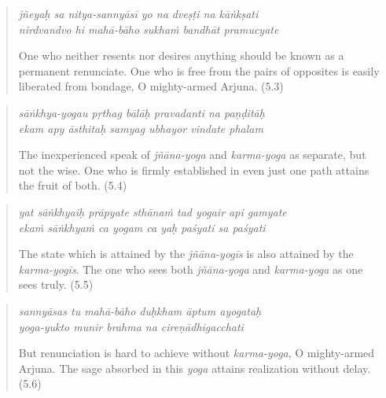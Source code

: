 \documentclass[12pt, twoside, openright]{memoir}
\begin{document}
\par
\begin{verse}
\textit{jñeyaḥ sa nitya-sannyāsī yo na dveṣṭi na kāṅkṣati} \\
\textit{nirdvandvo hi mahā-bāho sukhaṁ bandhāt pramucyate}

\noindent One who neither resents nor desires anything should be known as a permanent renunciate. One who is free from the pairs of opposites is easily liberated from bondage, O mighty-armed Arjuna. (5.3)
\end{verse}
\par



\par
\begin{verse}
\textit{sāṅkhya-yogau pṛthag bālāḥ pravadanti na paṇḍitāḥ} \\
\textit{ekam apy āsthitaḥ samyag ubhayor vindate phalam}

\noindent The inexperienced speak of \textit{jñāna-yoga} and \textit{karma-yoga} as separate, but not the wise. One who is firmly established in even just one path attains the fruit of both. (5.4)
\end{verse}
\par



\par
\begin{verse}
\textit{yat sāṅkhyaiḥ prāpyate sthānaṁ tad yogair api gamyate} \\
\textit{ekaṁ sāṅkhyaṁ ca yogam ca yaḥ paśyati sa paśyati}

\noindent The state which is attained by the \textit{jñāna-yogīs} is also attained by the \textit{karma-yogīs}. The one who sees both \textit{jñāna-yoga} and \textit{karma-yoga} as one sees truly. (5.5)
\end{verse}
\par



\par
\begin{verse}
\textit{sannyāsas tu mahā-bāho duḥkham āptum ayogataḥ} \\
\textit{yoga-yukto munir brahma na cireṇādhigacchati}

\noindent But renunciation is hard to achieve without \textit{karma-yoga}, O mighty-armed Arjuna. The sage absorbed in this \textit{yoga} attains realization without delay. (5.6)
\end{verse}
\par
\end{document}
